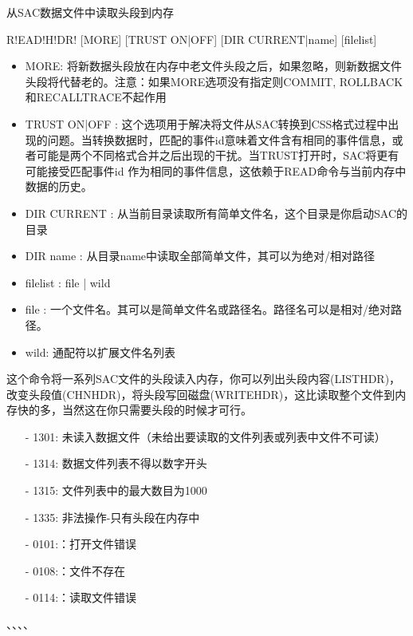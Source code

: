 \label{cmd:readhdr}

从SAC数据文件中读取头段到内存

\begin{SACSTX}
R!EAD!H!DR! [MORE] [TRUST ON|OFF] [DIR CURRENT|name] [filelist]
\end{SACSTX}

\begin{itemize}
\item MORE: 将新数据头段放在内存中老文件头段之后，如果忽略，则新数据文件头段将代替老的。注意：如果MORE选项没有指定则COMMIT, ROLLBACK和RECALLTRACE不起作用\\
\item TRUST ON|OFF : 这个选项用于解决将文件从SAC转换到CSS格式过程中出现的问题。当转换数据时，匹配的事件id意味着文件含有相同的事件信息，或者可能是两个不同格式合并之后出现的干扰。当TRUST打开时，SAC将更有可能接受匹配事件id 作为相同的事件信息，这依赖于READ命令与当前内存中数据的历史。
\item DIR CURRENT : 从当前目录读取所有简单文件名，这个目录是你启动SAC的目录 
\item DIR name : 从目录name中读取全部简单文件，其可以为绝对/相对路径 
\item filelist :  file | wild 
\item file : 一个文件名。其可以是简单文件名或路径名。路径名可以是相对/绝对路径。 
\item wild: 通配符以扩展文件名列表 
\end{itemize}

这个命令将一系列SAC文件的头段读入内存，你可以列出头段内容(LISTHDR)，改变头段值(CHNHDR)，将头段写回磁盘(WRITEHDR)，这比读取整个文件到内存快的多，当然这在你只需要头段的时候才可行。

\begin{itemize}
\item[-]1301: 未读入数据文件（未给出要读取的文件列表或列表中文件不可读）
\item[-]1314: 数据文件列表不得以数字开头
\item[-]1315: 文件列表中的最大数目为1000
\item[-]1335: 非法操作-只有头段在内存中
\end{itemize}

\begin{itemize}
\item[-]0101:：打开文件错误
\item[-]0108:：文件不存在
\item[-]0114:：读取文件错误
\end{itemize}

、、、、
